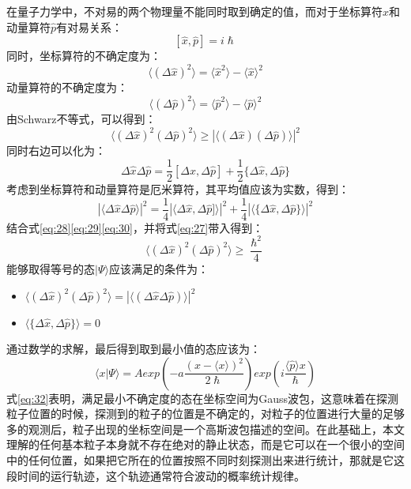 \documentclass[10pt,a4paper]{article}
\begin{document}
在量子力学中，不对易的两个物理量不能同时取到确定的值，而对于坐标算符$\hat{x}$和动量算符$\hat{p}$有对易关系：
\begin{equation}
\label{eq:27}
[\hat{x},\hat{p}]=i\hslash
\end{equation}
同时，坐标算符的不确定度为：
\[
\langle(\Delta \hat{x})^2\rangle=\langle \hat{x}^2\rangle-\langle \hat{x}\rangle^2
\]
动量算符的不确定度为：
\[
\langle(\Delta \hat{p})^2\rangle=\langle \hat{p}^2\rangle-\langle \hat{p}\rangle^2
\]
由Schwarz不等式，可以得到：
\begin{equation}
\label{eq:28}
\langle(\Delta \hat{x})^2(\Delta \hat{p})^2\rangle\geq|\langle(\Delta \hat{x})(\Delta \hat{p})\rangle|^2
\end{equation}
同时右边可以化为：
\begin{equation}
\label{eq:29}
\Delta \hat{x}\Delta\hat{p}=\frac{1}{2}[\Delta \hat{x},\Delta\hat{p}]+\frac{1}{2}\{\Delta \hat{x},\Delta\hat{p}\}
\end{equation}
考虑到坐标算符和动量算符是厄米算符，其平均值应该为实数，得到：
\begin{equation}
\label{eq:30}
|\langle\Delta \hat{x}\Delta\hat{p}\rangle|^2=\frac{1}{4}|\langle\Delta \hat{x},\Delta\hat{p}]\rangle|^2+\frac{1}{4}|\langle\{\Delta \hat{x},\Delta\hat{p}\}\rangle|^2
\end{equation}
结合式\eqref{eq:28}\eqref{eq:29}\eqref{eq:30}，并将式\eqref{eq:27}带入得到：
\begin{equation}
\label{eq:31}
\langle(\Delta \hat{x})^2(\Delta \hat{p})^2\rangle\geq\frac{\hslash^2}{4}
\end{equation}
能够取得等号的态$|\Psi\rangle$应该满足的条件为：
\begin{itemize}
\label{iterm:2}
	\item{$\langle(\Delta \hat{x})^2(\Delta \hat{p})^2\rangle=|\langle(\Delta \hat{x}\Delta \hat{p})\rangle|^2 $}
	\item{$ \langle\{\Delta \hat{x},\Delta \hat{p}\}\rangle=0$}
\end{itemize}
通过数学的求解，最后得到取到最小值的态应该为：
\begin{equation}
\label{eq:32}
\langle x|\Psi\rangle=Aexp(-a\frac{(x-\langle x\rangle)^2}{2\hslash})exp(i\frac{\langle\hat{p}\rangle x}{\hslash})
\end{equation}
式\eqref{eq:32}表明，满足最小不确定度的态在坐标空间为Gauss波包，这意味着在探测粒子位置的时候，探测到的粒子的位置是不确定的，对粒子的位置进行大量的足够多的观测后，粒子出现的坐标空间是一个高斯波包描述的空间。在此基础上，本文理解的任何基本粒子本身就不存在绝对的静止状态，而是它可以在一个很小的空间中的任何位置，如果把它所在的位置按照不同时刻探测出来进行统计，那就是它这段时间的运行轨迹，这个轨迹通常符合波动的概率统计规律。
\end{document}
